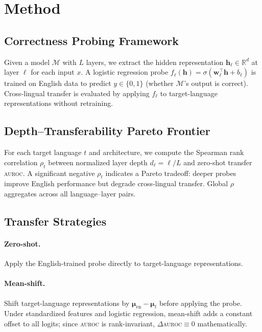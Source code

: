 \documentclass[11pt,a4paper]{article}
\newcommand{\auroc}{\textsc{auroc}}
\begin{document}
\section{Method}
\label{sec:method}

\subsection{Correctness Probing Framework}
\label{sec:probe}

Given a model $\mathcal{M}$ with $L$ layers, we extract the hidden representation $\mathbf{h}_\ell \in \mathbb{R}^d$ at layer $\ell$ for each input $x$.
A logistic regression probe $f_\ell(\mathbf{h}) = \sigma(\mathbf{w}_\ell^\top \mathbf{h} + b_\ell)$ is trained on English data to predict $y \in \{0,1\}$ (whether $\mathcal{M}$'s output is correct).
Cross-lingual transfer is evaluated by applying $f_\ell$ to target-language representations without retraining.

\subsection{Depth--Transferability Pareto Frontier}
\label{sec:pareto}

For each target language $t$ and architecture, we compute the Spearman rank correlation $\rho_t$ between normalized layer depth $d_\ell = \ell / L$ and zero-shot transfer \auroc{}.
A significant negative $\rho_t$ indicates a Pareto tradeoff: deeper probes improve English performance but degrade cross-lingual transfer.
Global $\rho$ aggregates across all language--layer pairs.

\subsection{Transfer Strategies}
\label{sec:transfer}

\paragraph{Zero-shot.}
Apply the English-trained probe directly to target-language representations.

\paragraph{Mean-shift.}
Shift target-language representations by $\boldsymbol{\mu}_{\text{en}} - \boldsymbol{\mu}_t$ before applying the probe.
Under standardized features and logistic regression, mean-shift adds a constant offset to all logits; since \auroc{} is rank-invariant, $\Delta$\auroc{}$\equiv 0$ mathematically.
\end{document}
